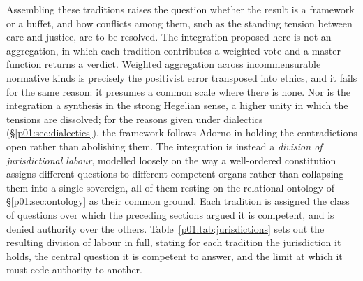 \documentclass[11pt,a4paper]{article}
\begin{document}
Assembling these traditions raises the question whether the result is a framework or a buffet, and how conflicts among them, such as the standing tension between care and justice, are to be resolved. The integration proposed here is not an aggregation, in which each tradition contributes a weighted vote and a master function returns a verdict. Weighted aggregation across incommensurable normative kinds is precisely the positivist error transposed into ethics, and it fails for the same reason: it presumes a common scale where there is none. Nor is the integration a synthesis in the strong Hegelian sense, a higher unity in which the tensions are dissolved; for the reasons given under dialectics (§\ref{p01:sec:dialectics}), the framework follows Adorno in holding the contradictions open rather than abolishing them. The integration is instead a \emph{division of jurisdictional labour}, modelled loosely on the way a well-ordered constitution assigns different questions to different competent organs rather than collapsing them into a single sovereign, all of them resting on the relational ontology of §\ref{p01:sec:ontology} as their common ground. Each tradition is assigned the class of questions over which the preceding sections argued it is competent, and is denied authority over the others. Table~\ref{p01:tab:jurisdictions} sets out the resulting division of labour in full, stating for each tradition the jurisdiction it holds, the central question it is competent to answer, and the limit at which it must cede authority to another.
\end{document}
